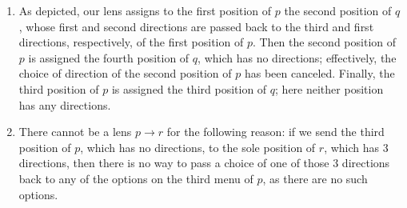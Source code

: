 \documentclass[Book-Poly]{subfiles}
\begin{document}
\begin{exercise}
\begin{solution}
\begin{enumerate}
	\[
    \begin{tikzpicture}
    	\node (p1) {
        	\begin{tikzpicture}[trees, sibling distance=2.5mm]
                \node[blue!50!black, "\tiny 1" below] (1) {$\bullet$}
                  child[blue!50!black] {coordinate (11)}
                  child[blue!50!black] {coordinate (12)}
                  child[blue!50!black] {coordinate (13)};
                \node[right=1.5 of 1, red!75!black, "\tiny 2" below] (2) {$\bullet$}
                  child[red!75!black] {coordinate (21)}
                  child[red!75!black] {coordinate (22)};
                \draw[|->, shorten <= 3pt, shorten >= 3pt] (1) -- (2);
                \begin{scope}[densely dotted, bend right, decoration={markings, mark=at position 0.75 with \arrow{stealth}}]
                  \draw[postaction={decorate}] (21) to (13);
                  \draw[postaction={decorate}] (22) to (11);
                \end{scope}
            \end{tikzpicture}
    	};
    	\node (p2) [right=1 of p1, yshift=-2mm] {
        	\begin{tikzpicture}[trees, sibling distance=2.5mm]
                \node[blue!50!black, "\tiny 2" below] (1) {$\bullet$}
                  child[blue!50!black] {coordinate (11)};
                \node[right=of 1, red!75!black, "\tiny 4" below] (2) {$\bullet$};
                \draw[|->, shorten <= 3pt, shorten >= 3pt] (1) -- (2);
            \end{tikzpicture}
    	};
    	\node (p3) [right=1 of p2, yshift=-2mm] {
        	\begin{tikzpicture}[trees, sibling distance=2.5mm]
                \node[blue!50!black, "\tiny 3" below] (1) {$\bullet$};
                \node[right=of 1, red!75!black, "\tiny 3" below] (2) {$\bullet$};
                \draw[|->, shorten <= 3pt, shorten >= 3pt] (1) -- (2);
            \end{tikzpicture}
    	};
    \end{tikzpicture}
    \]
    \item As depicted, our lens assigns to the first position of $p$ the second position of $q$, whose first and second directions are passed back to the third and first directions, respectively, of the first position of $p$.
    Then the second position of $p$ is assigned the fourth position of $q$, which has no directions; effectively, the choice of direction of the second position of $p$ has been canceled.
    Finally, the third position of $p$ is assigned the third position of $q$; here neither position has any directions.
    \item There cannot be a lens $p \to r$ for the following reason: if we send the third position of $p$, which has no directions, to the sole position of $r$, which has $3$ directions, then there is no way to pass a choice of one of those $3$ directions back to any of the options on the third menu of $p$, as there are no such options.
\end{enumerate}
\end{solution}
\end{exercise}
\end{document}
